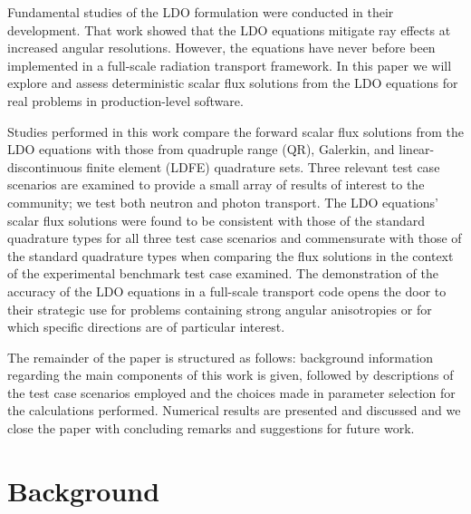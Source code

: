 \documentclass{article} %
\begin{document}
Fundamental studies of the LDO formulation were
conducted in their development. That work showed that the LDO equations
 mitigate ray effects at increased angular resolutions. 
However, the equations have never before
been implemented in a full-scale radiation transport framework. In this paper we will explore and assess deterministic scalar flux solutions
from the LDO equations for real problems in production-level software. 

Studies performed in this work compare the forward scalar flux solutions from
the LDO equations with those from quadruple range (QR), Galerkin, and
linear-discontinuous finite element (LDFE) quadrature sets. Three relevant
test case scenarios are examined to provide a small array of results of
interest to the community; we test both neutron and photon transport.
The LDO equations' scalar flux solutions were found to be consistent with those
of the standard quadrature types for all three test case scenarios and 
commensurate with those of the standard quadrature types when comparing the
flux solutions in the context of the experimental benchmark test case examined.
The demonstration of the accuracy of the LDO equations in a full-scale transport code opens the door to their strategic use for problems containing strong angular anisotropies or for which specific directions are of particular interest. 


The remainder of the paper is structured as follows: background information
regarding the main components of this work is given, followed by descriptions
of the test case scenarios employed and the choices made in parameter selection
for the calculations performed. Numerical results are presented and discussed
and we close the paper with concluding remarks and suggestions for future work.

\section{Background}
\label{sec:background}
\end{document}
